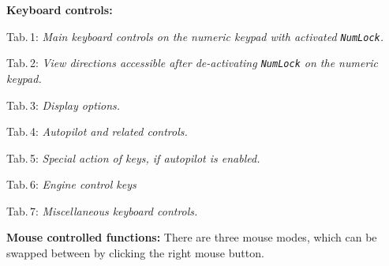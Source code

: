 \documentclass[10pt]{article}
\begin{document}
 \noindent
 \textbf{Keyboard controls:}
\begin{multicols}{2}
 \noindent
 Tab.\,1: \textit{Main keyboard controls on the numeric keypad with
 activated \texttt{NumLock}.}\\

\noindent

\bigskip

 \noindent
 Tab.\,2: \textit{View directions accessible after de-activating \texttt{NumLock} on the numeric keypad.}
\medskip

 \noindent
 
\bigskip

 \noindent
 Tab.\,3: \textit{Display options.}
\medskip

 \noindent

\bigskip
\rule{0mm}{15mm}


\medskip

 \noindent
 Tab.\,4: \textit{Autopilot and related controls.}
\medskip

\noindent

\medskip

 \noindent
Tab.\,5: \textit{Special action of keys, if autopilot is enabled.}
\medskip

 \noindent

\medskip


 \noindent
Tab.\,6: \textit{Engine control keys}
\medskip

 \noindent

\medskip

 \noindent
Tab.\,7: \textit{Miscellaneous keyboard controls.}
\medskip

 \noindent

\medskip


\end{multicols}

 \noindent
 \textbf{Mouse controlled functions:}
 There are three mouse modes, which can be swapped between by clicking the right mouse button.
\end{document}
